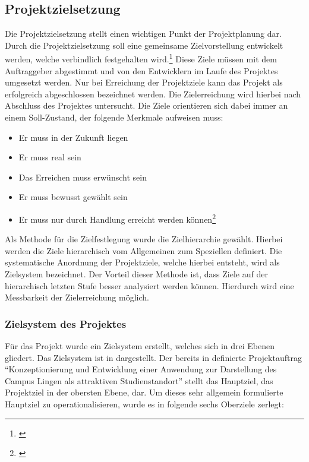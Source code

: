 \subsection{Projektzielsetzung}
\label{sec:Projektzielsetzung}

Die Projektzielsetzung stellt einen wichtigen Punkt der Projektplanung dar.
Durch die Projektzielsetzung soll eine gemeinsame Zielvorstellung entwickelt
werden, welche verbindlich festgehalten wird.\footnote{\citet[S.~34]{litke2007}}
Diese Ziele müssen mit dem Auftraggeber abgestimmt und von den Entwicklern im
Laufe des Projektes umgesetzt werden. Nur bei Erreichung der Projektziele kann
das Projekt als erfolgreich abgeschlossen bezeichnet werden. Die Zielerreichung
wird hierbei nach Abschluss des Projektes untersucht. Die Ziele orientieren
sich dabei immer an einem Soll-Zustand, der folgende Merkmale aufweisen muss:

\begin{itemize}
  \item Er muss in der Zukunft liegen
  \item Er muss real sein
  \item Das Erreichen muss erwünscht sein
  \item Er muss bewusst gewählt sein
  \item Er muss nur durch Handlung erreicht werden
  können\footnote{\citet[S.~33]{litke2007}}
\end{itemize}

Als Methode für die Zielfestlegung wurde die Zielhierarchie gewählt. Hierbei
werden die Ziele hierarchisch vom Allgemeinen zum Speziellen definiert. Die
systematische Anordnung der Projektziele, welche hierbei entsteht, wird als
Zielsystem bezeichnet. Der Vorteil dieser Methode ist, dass Ziele auf der
hierarchisch letzten Stufe besser analysiert werden können. Hierdurch wird eine
Messbarkeit der Zielerreichung möglich. 

\subsubsection{Zielsystem des Projektes}
\label{sec:Zielsystem}

Für das Projekt wurde ein Zielsystem erstellt, welches sich in drei Ebenen
gliedert. Das Zielsystem ist in  dargestellt. Der bereits in
 definierte Projektauftrag "`Konzeptionierung und
Entwicklung einer Anwendung zur Darstellung des Campus Lingen als attraktiven
Studienstandort"' stellt das Hauptziel, das Projektziel in der obersten Ebene,
dar. Um dieses sehr allgemein formulierte Hauptziel zu operationalisieren, wurde
es in folgende sechs Oberziele zerlegt:

